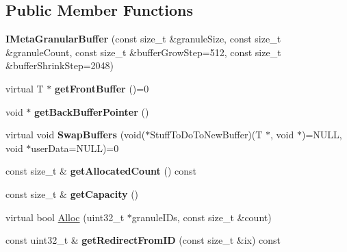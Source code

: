 \subsection*{Public Member Functions}
\begin{DoxyCompactItemize}
\item 
{\bfseries I\+Meta\+Granular\+Buffer} (const size\+\_\+t \&granule\+Size, const size\+\_\+t \&granule\+Count, const size\+\_\+t \&buffer\+Grow\+Step=512, const size\+\_\+t \&buffer\+Shrink\+Step=2048)\hypertarget{classirr_1_1core_1_1IMetaGranularBuffer_a97aea503eee9c815d3e38d684188108c}{}\label{classirr_1_1core_1_1IMetaGranularBuffer_a97aea503eee9c815d3e38d684188108c}

\item 
virtual T $\ast$ {\bfseries get\+Front\+Buffer} ()=0\hypertarget{classirr_1_1core_1_1IMetaGranularBuffer_ac1c88ef8dfece9e74ee2c872aa09d77b}{}\label{classirr_1_1core_1_1IMetaGranularBuffer_ac1c88ef8dfece9e74ee2c872aa09d77b}

\item 
void $\ast$ {\bfseries get\+Back\+Buffer\+Pointer} ()\hypertarget{classirr_1_1core_1_1IMetaGranularBuffer_a163b18f0f1b95312bfb3c898bae695bb}{}\label{classirr_1_1core_1_1IMetaGranularBuffer_a163b18f0f1b95312bfb3c898bae695bb}

\item 
virtual void {\bfseries Swap\+Buffers} (void($\ast$Stuff\+To\+Do\+To\+New\+Buffer)(T $\ast$, void $\ast$)=N\+U\+LL, void $\ast$user\+Data=N\+U\+LL)=0\hypertarget{classirr_1_1core_1_1IMetaGranularBuffer_af4f5b75a9efba16838e5abc99f6201bc}{}\label{classirr_1_1core_1_1IMetaGranularBuffer_af4f5b75a9efba16838e5abc99f6201bc}

\item 
const size\+\_\+t \& {\bfseries get\+Allocated\+Count} () const \hypertarget{classirr_1_1core_1_1IMetaGranularBuffer_aeba8de5e23886c0087b8a69533393e19}{}\label{classirr_1_1core_1_1IMetaGranularBuffer_aeba8de5e23886c0087b8a69533393e19}

\item 
const size\+\_\+t \& {\bfseries get\+Capacity} ()\hypertarget{classirr_1_1core_1_1IMetaGranularBuffer_a5086dbd701e9fe944b6b3cc53dba3715}{}\label{classirr_1_1core_1_1IMetaGranularBuffer_a5086dbd701e9fe944b6b3cc53dba3715}

\item 
virtual bool \hyperlink{classirr_1_1core_1_1IMetaGranularBuffer_a643ec9c885022593d6e4b653bed6f97f}{Alloc} (uint32\+\_\+t $\ast$granule\+I\+Ds, const size\+\_\+t \&count)
\item 
const uint32\+\_\+t \& {\bfseries get\+Redirect\+From\+ID} (const size\+\_\+t \&ix) const \hypertarget{classirr_1_1core_1_1IMetaGranularBuffer_aadc2dbdd80003f830bc62bbc7aa8dd82}{}\label{classirr_1_1core_1_1IMetaGranularBuffer_aadc2dbdd80003f830bc62bbc7aa8dd82}


\end{DoxyCompactItemize}
